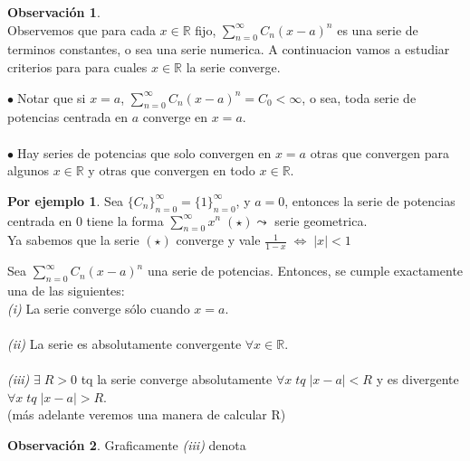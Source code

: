 \documentclass{article}
\theoremstyle{definition}
\theoremstyle{definition}
\newtheorem*{obs}{Observación}
\newtheorem*{ej}{Por ejemplo}
\theoremstyle{remark}
\newcommand\bl{$\bullet\;$}
\begin{document}
\begin{obs} \; \\
  Observemos que para cada $x \in \mathbb{R}$ fijo, $\sum_{n=0}^{\infty}{C_n(x-a)^n}$ es una serie de terminos constantes, o sea una serie numerica. A continuacion vamos a estudiar criterios para para cuales $x \in \mathbb{R}$ la serie converge.  
\end{obs}
\bl Notar que si $x=a$, $\sum_{n=0}^{\infty}{C_n(x-a)^n}=C_0 < \infty$, o sea, toda serie de potencias centrada en $a$ converge en $x=a$.
 \\  \\
 \bl Hay series de potencias que solo convergen en $x=a$ otras que convergen para algunos $x \in \mathbb{R}$ y otras que convergen en todo $x \in \mathbb{R}$.
\begin{ej}
  Sea $\{C_n\}_{n=0}^{\infty} = \{1\}_{n=0}^{\infty}$, y $a=0$, entonces la serie de potencias centrada en $0$ tiene la forma $\sum_{n=0}^{\infty}{x^n \; (\star)\leadsto}$ serie geometrica. \\ 
  Ya sabemos que la serie $(\star)$ converge y vale $\frac{1}{1-x} \; \Longleftrightarrow \; |x| < 1 $
    
\end{ej}
\begin{figure}[h]
\centering
\def\svgwidth{0.75\textwidth}

\end{figure}
\pagebreak
\begin{teo}
  Sea $\sum_{n=0}^{\infty}{C_n(x-a)^n}$ una serie de potencias. Entonces, se cumple exactamente una de las siguientes: \\ 
   
  \emph{(i)\phantom{ii}} La serie converge sólo cuando $x=a$. \\\\ 
  \emph{(ii)\phantom{i}}  La serie es absolutamente convergente $\forall x \in \mathbb{R}$.   \\ \\  
  \emph{(iii)} $\exists \; R > 0$ tq la serie converge absolutamente $\forall x \; tq \; |x-a| < R$ y es divergente $\forall x \; tq \; |x-a| > R$. \\ (más adelante veremos una manera de calcular R) 

\end{teo}
\begin{obs}
Graficamente \emph{(iii)} denota 
\end{obs}

\begin{figure}[h]
\centering
\def\svgwidth{0.75\textwidth}

\end{figure}
\end{document}
